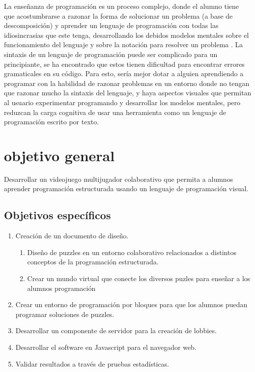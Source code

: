 La enseñanza de programación es un proceso complejo, donde el alumno tiene que acostumbrarse a razonar la forma de solucionar un problema (a base de descomposición) y aprender un lenguaje de programación con todas las idiosincrasias que este tenga, desarrollando los debidos modelos mentales sobre el funcionamiento del lenguaje y sobre la notación para resolver un problema \cite{mow-a}. La sintaxis de un lenguaje de programación puede ser complicado para un principiante, se ha encontrado que estos tienen dificultad para encontrar errores gramaticales en su código. Para esto, sería mejor dotar a alguien aprendiendo a programar con la habilidad de razonar problemas en un entorno donde no tengan que razonar mucho la sintaxis del lenguaje, y haya aspectos visuales que permitan al usuario experimentar programando y desarrollar los modelos mentales, pero reduzcan la carga cognitiva de usar una herramienta como un lenguaje de programación escrito por texto. 

\section{objetivo general}
Desarrollar un videojuego multijugador colaborativo que permita a alumnos aprender programación estructurada usando un lenguaje de programación visual. 

\subsection{Objetivos específicos}

\begin{enumerate}
    \item Creación de un documento de diseño.
    \begin{enumerate}
        \item Diseño de puzzles en un entorno colaborativo relacionados a distintos conceptos de la programación estructurada. 
        \item 	Crear un mundo virtual que conecte los diversos puzles para enseñar a los alumnos programación 
    \end{enumerate}
    \item Crear un entorno de programación por bloques para que los alumnos puedan programar soluciones de puzzles.
    \item Desarrollar un componente de servidor para la creación de lobbies.
    \item Desarrollar el software en Javascript para el navegador web.
    \item Validar resultados a través de pruebas estadísticas.
\end{enumerate}

